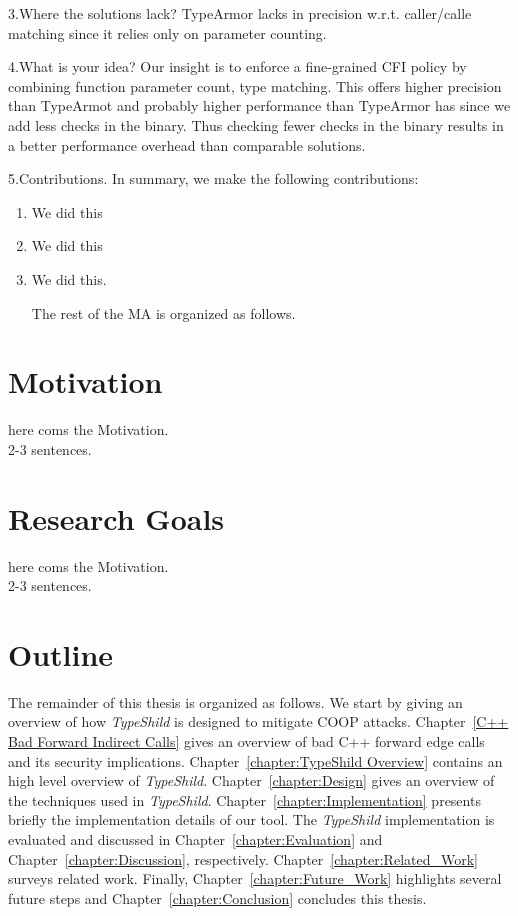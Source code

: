 
3.Where the solutions lack?
TypeArmor lacks in precision w.r.t. caller/calle matching since it relies only on parameter counting.

4.What is your idea?
Our insight is to enforce a fine-grained CFI policy by combining function parameter count, type matching.
This offers higher precision than TypeArmot and probably higher performance than TypeArmor has since we 
add less checks in the binary. Thus checking fewer checks in the binary results in a better performance 
overhead than comparable solutions.

5.Contributions.
In summary, we make the following contributions:

\begin{enumerate}
 \item We did this 
 
 \item We did this 
 
 \item We did this.
 
 The rest of the MA is organized as follows.
 
\end{enumerate}

\section{Motivation}
here coms the Motivation.
\\
2-3 sentences.

\section{Research Goals}
here coms the Motivation.
\\
2-3 sentences.

\section{Outline}
The remainder of this thesis is organized as follows.
We start by giving an overview of how \textit{TypeShild}
is designed to mitigate COOP attacks. 
Chapter~\ref{C++ Bad Forward Indirect Calls} gives an overview of bad C++
forward edge calls and its security implications.
Chapter~\ref{chapter:TypeShild Overview} contains an high level overview of \textit{TypeShild}.
Chapter~\ref{chapter:Design} gives an overview of the techniques
used in \textit{TypeShild}.
Chapter~\ref{chapter:Implementation} presents briefly the implementation
details of our tool.
The \textit{TypeShild} implementation is evaluated and discussed in
Chapter~\ref{chapter:Evaluation} and Chapter~\ref{chapter:Discussion}, respectively.
Chapter~\ref{chapter:Related_Work} surveys related work.
Finally, Chapter~\ref{chapter:Future_Work} highlights several future steps and
Chapter~\ref{chapter:Conclusion} concludes this thesis.


